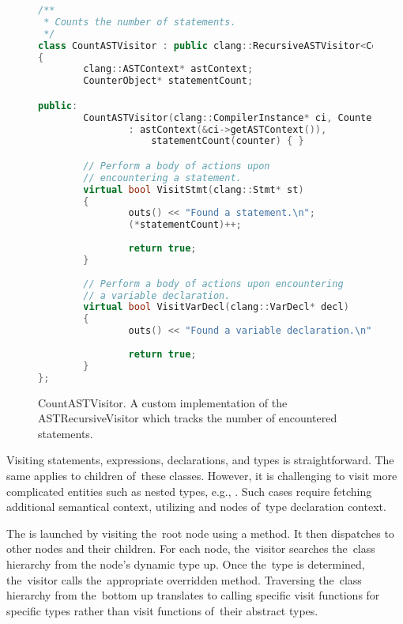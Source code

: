 \begin{figure}[ht]\centering
\begin{lstlisting}[language=C++]
/**
 * Counts the number of statements.
 */
class CountASTVisitor : public clang::RecursiveASTVisitor<CountASTVisitor>
{
        clang::ASTContext* astContext;
        CounterObject* statementCount;

public:
        CountASTVisitor(clang::CompilerInstance* ci, CounterObject* counter)
                : astContext(&ci->getASTContext()), 
					statementCount(counter) { }

		// Perform a body of actions upon 
		// encountering a statement.
        virtual bool VisitStmt(clang::Stmt* st)
        {
                outs() << "Found a statement.\n";
				(*statementCount)++;
				
                return true;
        }
		
		// Perform a body of actions upon encountering 
		// a variable declaration.
		virtual bool VisitVarDecl(clang::VarDecl* decl)
        {
                outs() << "Found a variable declaration.\n";
				
                return true;
        }
};
\end{lstlisting}
\caption{CountASTVisitor. A custom implementation of the ASTRecursiveVisitor
which tracks the number of encountered statements.}
\label{lst:countvisitor}
\end{figure}

Visiting statements, expressions, declarations, 
and types is straightforward. 
The same applies to children of~these classes. 
However, it is challenging to visit more complicated entities 
such as nested types, e.g., . 
Such cases require fetching additional semantical context, 
utilizing  and nodes of~type declaration context.


The  is launched by visiting the~root node using 
a  method. 
It then dispatches to other nodes and their children. 
For each node, the~visitor searches the~class hierarchy from 
the node's dynamic type up. 
Once the~type is determined, the~visitor calls the~appropriate 
overridden  method. 
Traversing the~class hierarchy from the~bottom up 
translates to calling specific visit functions for specific types 
rather than visit functions of~their abstract types.

